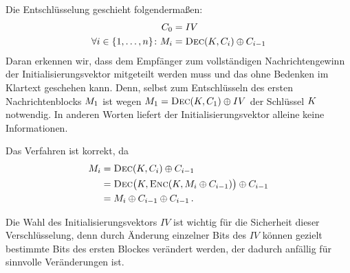 Die Entschlüsselung geschieht folgendermaßen:
\begin{align*}
	C_0 &= IV\\
	\forall i \in \{1,\dots,n\}\colon M_i &= \textsc{Dec}(K, C_i) \oplus C_{i-1}
\end{align*}
Daran erkennen wir, dass dem Empfänger zum vollständigen Nachrichtengewinn der Initialisierungsvektor \indexIV mitgeteilt werden muss und das ohne Bedenken im Klartext geschehen kann. Denn, selbst zum Entschlüsseln des ersten Nachrichtenblocks $M_{1}$ ist wegen $M_{1} = \textsc{Dec}(K, C_{1}) \oplus IV$ der Schlüssel $K$ notwendig. In anderen Worten liefert der Initialisierungsvektor alleine keine Informationen.

Das Verfahren ist korrekt, da
\begin{align*}
	\begin{split}
		M_i &= \textsc{Dec}(K,C_i)\oplus C_{i-1}\\
		&= \textsc{Dec} \bigl(K,\textsc{Enc}(K,M_i\oplus C_{i-1})\bigr) \oplus C_{i-1}\\
		&= M_i\oplus C_{i-1}\oplus C_{i-1}\, .
	\end{split}
\end{align*}

Die Wahl des Initialisierungsvektors $IV$ \indexIV ist wichtig für die Sicherheit dieser Verschlüsselung, denn durch Änderung einzelner Bits des $IV$ können gezielt
bestimmte Bits des ersten Blockes verändert werden, der dadurch anfällig für sinnvolle Veränderungen ist.

